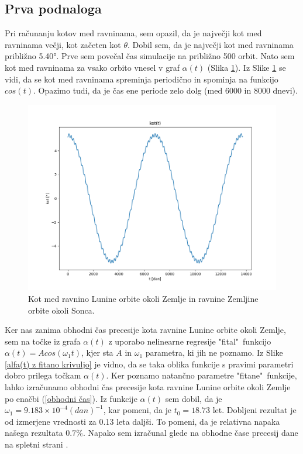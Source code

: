 \documentclass[titlepage,12pt,a4paper]{article}
\begin{document}
\subsection{Prva podnaloga}
Pri računanju kotov med ravninama, sem opazil, da je največji kot med ravninama večji, kot začeten kot  $\theta$. Dobil sem, da je največji kot med ravninama približno 5.40°. Prve sem povečal čas simulacije na približno 500 orbit. Nato sem kot med ravninama za vsako orbito vnesel v graf $\alpha(t)$ (Slika \ref{koti inklinacije v grafu}). Iz Slike \ref{koti inklinacije v grafu} se vidi, da se kot med ravninama spreminja periodično in spominja na funkcijo $cos(t)$. Opazimo tudi, da je čas ene periode zelo dolg (med 6000 in 8000 dnevi).

\begin{figure}[H]
\begin{center}
	\includegraphics[scale=0.6]{Slike/inklinacija_kot_t}
	\caption{Kot med ravnino Lunine orbite okoli Zemlje in ravnine Zemljine orbite okoli Sonca.}
	\label{koti inklinacije v grafu}
\end{center}
\end{figure}

Ker nas zanima obhodni čas precesije kota ravnine Lunine orbite okoli Zemlje, sem na točke iz grafa $\alpha(t)$ z uporabo nelinearne regresije "fital"\ funkcijo $\alpha(t) = A cos(\omega_1 t)$, kjer sta $A$ in $\omega_1$ parametra, ki jih ne poznamo. Iz Slike  \ref{alfa(t) z fitano krivuljo} je vidno, da se taka oblika funkcije s pravimi parametri dobro prilega točkam $\alpha(t)$. Ker poznamo natančno  parametre "fitane"\ funkcije, lahko izračunamo obhodni čas precesije kota ravnine Lunine orbite okoli Zemlje po enačbi (\ref{obhodni čas}). Iz funkcije $\alpha(t)$ sem dobil, da je $\omega_1 = 9.183 \times 10^{-4}(dan)^{-1}$, kar pomeni, da je $t_0 = 18.73$ let. Dobljeni rezultat je od izmerjene vrednosti za 0.13 leta daljši. To pomeni, da je relativna napaka našega rezultata $0.7\%$. Napako sem izračunal glede na obhodne čase precesij dane na spletni strani \cite{Lun. preces.}.
\end{document}
